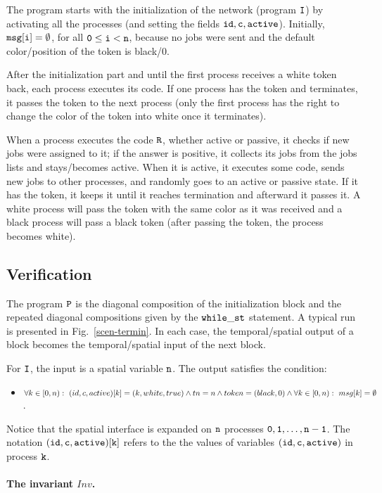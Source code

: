 \documentclass[runningheads]{llncs}
\newcommand{\1}{\u{a}}
\newcommand{\2}{\c{s}}
\newcommand{\5}{\c{t}}
\newcommand{\8}{\^{\i}}
\newcommand{\9}{\^{a}}
\newcommand{\bi}{\begin{itemize}}
\newcommand{\ei}{\end{itemize}}
\newcommand{\co}{\,\colon\;}
\begin{document}
The program starts with the initialization of the network (program ${\tt I}$) by activating all the processes
(and setting the fields ${\tt id,c,active}$).  Initially, ${\tt msg[i]=\emptyset}$, for all ${\tt 0\leq i <
n}$, because no jobs were sent and the default color/position of the token is black/0.

After the initialization part and until the first process receives a white token back, each process executes
its code. If one process has the token and terminates, it passes the token to the next process (only the first
process has the right to change the color of the token into white once it terminates).

When a process executes the code ${\tt R}$, whether active or passive, it checks if new jobs were assigned to
it; if the answer is positive, it collects its jobs from the jobs lists and stays/becomes active. When it is
active, it executes some code, sends new jobs to other processes, and randomly goes to an active or passive
state. If it has the token, it keeps it until it reaches termination and afterward it passes it. A white
process will pass the token with the same color as it was received and a black process will pass a black token
(after passing the token, the process becomes white).\vspace*{-0.1cm}

\subsection{Verification}

The program ${\tt P}$ is the diagonal composition of the initialization block and the repeated diagonal
compositions given by the ${\tt while\_st}$ statement. A typical run is presented in
Fig.~\ref{scen-termin}. In each case, the temporal/spatial output of a block becomes the temporal/spatial
input of the next block.

For ${\tt I}$, the input is a spatial variable ${\tt n}$. The output satisfies the condition:\bi\item[]
$\forall k\in[0,n)\co (id,c,active)[k]=(k,white,true)\\ \wedge tn=n\wedge token=(black,0) \wedge
\forall k\in[0,n)\co msg[k]=\emptyset$.\ei Notice that the spatial interface is expanded on ${\tt n}$
processes ${\tt 0,1,\dots,n-1}$. The notation ${\tt (id,c,active)[k]}$ refers to the the values of variables
${\tt (id,c,active)}$ in process ${\tt k}$.

\paragraph{The invariant $Inv$.}
\end{document}
